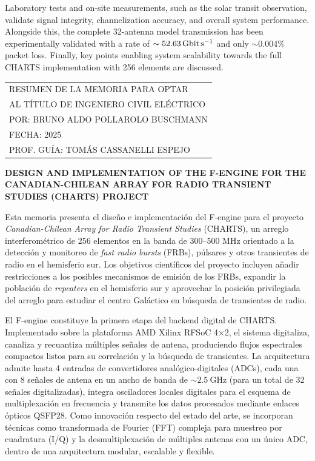 \documentclass[
	12pt,
	letterpaper,
  oneside
  ]{book}
\newenvironment{preliminary}{
  \pagestyle{plain}\pagenumbering{roman}
  }{\cleardoublepage\pagenumbering{arabic}}
\begin{document}
\begin{preliminary}
  Laboratory tests and on-site measurements, such as the solar transit observation, validate signal integrity, channelization accuracy, and overall system performance. Alongside this, the complete \num{32}-antenna model transmission has been experimentally validated with a rate of $\sim\qty{52.63}{\giga\bit\per\second}$ and only $\sim0.004\%$ packet loss. Finally, key points enabling system scalability towards the full CHARTS implementation with 256 elements are discussed.
  
  \newpage

  \begin{flushright}
    \begin{tabular}{l}
      RESUMEN DE LA MEMORIA PARA OPTAR \\
      AL TÍTULO DE INGENIERO CIVIL ELÉCTRICO \\
      POR: \MakeUppercase{Bruno Aldo Pollarolo Buschmann} \\
      FECHA: 2025 \\
      PROF. GUÍA: TOMÁS CASSANELLI ESPEJO
    \end{tabular}
  \end{flushright}

  \begin{center}
    \MakeUppercase{\textbf{Design and implementation of the F-engine for the Canadian-Chilean Array for Radio Transient Studies (CHARTS) project}}
  \end{center}

  Esta memoria presenta el diseño e implementación del F-engine para el proyecto \textit{Canadian-Chilean Array for Radio Transient Studies} (CHARTS), un arreglo interferométrico de 256 elementos en la banda de 300--500 MHz orientado a la detección y monitoreo de \textit{fast radio bursts} (FRBs), púlsares y otros transientes de radio en el hemisferio sur. Los objetivos científicos del proyecto incluyen añadir restricciones a los posibles mecanismos de emisión de los FRBs, expandir la población de \textit{repeaters} en el hemisferio sur y aprovechar la posición privilegiada del arreglo para estudiar el centro Galáctico en búsqueda de transientes de radio.

  El F-engine constituye la primera etapa del backend digital de CHARTS. Implementado sobre la plataforma AMD Xilinx RFSoC 4×2, el sistema digitaliza, canaliza y recuantiza múltiples señales de antena, produciendo flujos espectrales compactos listos para su correlación y la búsqueda de transientes. La arquitectura admite hasta 4 entradas de convertidores analógico-digitales (ADCs), cada una con 8 señales de antena en un ancho de banda de $\sim\qty{2.5}{\giga\hertz}$ (para un total de \num{32} señales digitalizadas), integra osciladores locales digitales para el esquema de multiplexación en frecuencia y transmite los datos procesados mediante enlaces ópticos QSFP28. Como innovación respecto del estado del arte, se incorporan técnicas como transformada de Fourier (FFT) compleja para muestreo por cuadratura (I/Q) y la desmultiplexación de múltiples antenas con un único ADC, dentro de una arquitectura modular, escalable y flexible.


\end{preliminary}
\end{document}
